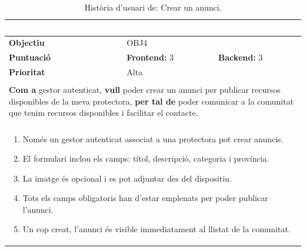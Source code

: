 \documentclass[11pt,a4paper]{report}
\newcommand{\HU}[9]{%
\begin{table}[H]\centering\footnotesize\renewcommand{\arraystretch}{1.1}%
\setlength{\extrarowheight}{0pt}%
\begin{tabular}{|l|p{4.8cm}|p{4.8cm}|}\hline
\rowcolor{oceanblue}\textcolor{white}{\textbf{Història d'Usuari}} & \multicolumn{2}{l|}{\textcolor{white}{#2}} \\\hline
\textbf{Objectiu} & \multicolumn{2}{l|}{#1} \\\hline
\rowcolor{gray!10}\textbf{Puntuació} & \textbf{Frontend: } #3 & \textbf{Backend: } #4 \\\hline
\textbf{Prioritat} & \multicolumn{2}{l|}{#5} \\\hline
\rowcolor{oceanblue}\multicolumn{3}{|l|}{\textcolor{white}{\textbf{Descripció}}} \\\hline
\multicolumn{3}{|p{12.5cm}|}{\textbf{Com a} #6, \textbf{vull} #7, \textbf{per tal de} #8.} \\\hline
\rowcolor{oceanblue}\multicolumn{3}{|l|}{\textcolor{white}{\textbf{Criteris d'Acceptació}}} \\\hline
\multicolumn{3}{|p{12.5cm}|}{\begin{enumerate}[leftmargin=0.4cm,topsep=0pt,parsep=0pt,itemsep=1pt,partopsep=0pt,after=\vspace{-3pt}] #9 \end{enumerate}} \\\hline
\end{tabular}\caption[HU: #2]{Història d'usuari de: #2.}\label{tab:hu_#1}\end{table}%
}
\begin{document}
    \HU{OBJ4}
    {Crear un anunci}
    {3}
    {3}
    {Alta}
    {gestor autenticat}
    {poder crear un anunci per publicar recursos disponibles de la meva protectora}
    {poder comunicar a la comunitat que tenim recursos disponibles i facilitar el contacte}
    {
        \item Només un gestor autenticat associat a una protectora pot crear anuncis.
        \item El formulari inclou els camps: títol, descripció, categoria i província.
        \item La imatge és opcional i es pot adjuntar des del dispositiu.
        \item Tots els camps obligatoris han d'estar emplenats per poder publicar l'anunci.
        \item Un cop creat, l'anunci és visible immediatament al llistat de la comunitat.
    }
\end{document}
